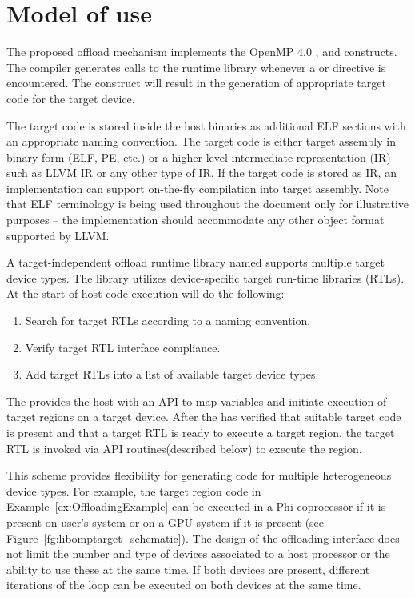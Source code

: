 \section{Model of use}

The proposed offload mechanism implements the OpenMP 4.0 \dtargetdata{}, \dtarget{} and \ddeclaretarget{} constructs. The compiler generates calls to the runtime library whenever a \dtargetdata{} or \dtarget{} directive is encountered. The \ddeclaretarget{} construct will result in the generation of appropriate target code for the target device.

The target code is stored inside the host binaries as additional ELF sections with an appropriate naming convention. The target code is either target assembly in binary form (ELF, PE, etc.) or a higher-level intermediate representation (IR) such as LLVM IR or any other type of IR. If the target code is stored as IR, an implementation can support on-the-fly compilation into target assembly. Note that ELF terminology is being used throughout the document only for illustrative purposes – the implementation should accommodate any other object format supported by LLVM.

A target-independent offload runtime library named \libomptarget{} supports multiple target device types. The \libomptarget{} library utilizes device-specific target run-time libraries (RTLs). At the start of host code execution \libomptarget{} will do the following:

\begin{enumerate}
  \item Search for target RTLs according to a naming convention. 

  \item Verify target RTL interface compliance.

  \item Add target RTLs into a list of available target device types. 
\end{enumerate}

The \libomptarget{} provides the host with an API to map variables and initiate execution of target regions on a target device. After the \libomptarget{} has verified that suitable target code is present and that a target RTL is ready to execute a target region, the target RTL is invoked via API routines(described below) to execute the region.

This scheme provides flexibility for generating code for multiple heterogeneous device types. For example, the target region code in Example~\ref{ex:OffloadingExample} can be executed in a Phi\texttrademark{} coprocessor if it is present on user’s system or on a GPU system if it is present (see Figure~\ref{fg:libomptarget_schematic}). The design of the offloading interface does not limit the number and type of devices associated to a host processor or the ability to use these at the same time. If both devices are present, different iterations of the loop can be executed on both devices at the same time.

